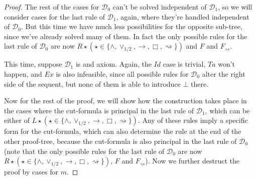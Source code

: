 \documentclass[12pt,a4paper]{article}
\theoremstyle{plain}
\theoremstyle{definition}
\begin{document}
\begin{proof}
 The rest of the cases for $\mathcal{D}_0$ can't be solved independent of $\mathcal{D}_1$, so we will consider cases for the last rule of $\mathcal{D}_1$, again, where they're handled independent of $\mathcal{D}_0$. But this time we have much less possibilities for the opposite sub-tree, since we've already solved many of them. In fact the only possible rules for the last rule of $\mathcal{D}_0$ are now $R\star (\star \in \{\land, \lor_{1/2}, \rightarrow, \Box, \rightsquigarrow\})$ and $F$ and $F_\rightsquigarrow$.

 This time, suppose $\mathcal{D}_1$ is and axiom. Again, the $Id$ case is trivial, $Ta$ won't happen, and $Ex$ is also infeasible, since all possible rules for $\mathcal{D}_0$ alter the right side of the sequent, but none of them is able to introduce $\bot$ there.

 Now for the rest of the proof, we will show how the construction takes place in the cases where the cut-formula is principal in the last rule of $\mathcal{D}_1$, which can be either of $L\star (\star \in \{\land, \lor_{1/2}, \rightarrow, \Box, \rightsquigarrow\})$.
 Any of these rules imply a specific form for the cut-formula, which can also determine the rule at the end of the other proof-tree, because the cut-formula is also principal in the last rule of $\mathcal{D}_0$ (note that the only possible rules for the last rule of $\mathcal{D}_0$ are now $R\star (\star \in \{\land, \lor_{1/2}, \rightarrow, \Box, \rightsquigarrow\})$, $F$ and $F_\rightsquigarrow$).
 Now we further destruct the proof by cases for $m$.
 

\end{proof}
\end{document}
